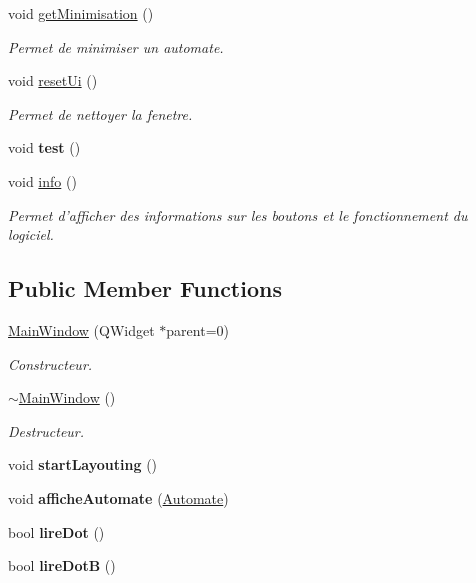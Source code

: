 \begin{DoxyCompactItemize}
void \hyperlink{class_main_window_ae81811139b9d004b68f5654ad40a7b52}{get\-Minimisation} ()
\begin{DoxyCompactList}\small\item\em Permet de minimiser un automate. \end{DoxyCompactList}\item 
void \hyperlink{class_main_window_ae0830e3c5a46ae29d7fd9cc870fe6c08}{reset\-Ui} ()
\begin{DoxyCompactList}\small\item\em Permet de nettoyer la fenetre. \end{DoxyCompactList}\item 
\hypertarget{class_main_window_adef6f7c5939e0e2b60414a55d716ddc8}{void {\bfseries test} ()}\label{class_main_window_adef6f7c5939e0e2b60414a55d716ddc8}

\item 
void \hyperlink{class_main_window_a78f945084286506a64269d4ee75db224}{info} ()
\begin{DoxyCompactList}\small\item\em Permet d'afficher des informations sur les boutons et le fonctionnement du logiciel. \end{DoxyCompactList}\end{DoxyCompactItemize}
\subsection*{Public Member Functions}
\begin{DoxyCompactItemize}
\item 
\hyperlink{class_main_window_a8b244be8b7b7db1b08de2a2acb9409db}{Main\-Window} (Q\-Widget $\ast$parent=0)
\begin{DoxyCompactList}\small\item\em Constructeur. \end{DoxyCompactList}\item 
\hyperlink{class_main_window_ae98d00a93bc118200eeef9f9bba1dba7}{$\sim$\-Main\-Window} ()
\begin{DoxyCompactList}\small\item\em Destructeur. \end{DoxyCompactList}\item 
\hypertarget{class_main_window_a22ccaf0f029e895977c18774bf9ef115}{void {\bfseries start\-Layouting} ()}\label{class_main_window_a22ccaf0f029e895977c18774bf9ef115}

\item 
\hypertarget{class_main_window_ac9f5af352ce35293a2246f28af46b88c}{void {\bfseries affiche\-Automate} (\hyperlink{class_automate}{Automate})}\label{class_main_window_ac9f5af352ce35293a2246f28af46b88c}

\item 
\hypertarget{class_main_window_a7c730609e4e9f30d1b2dc88f8762a05c}{bool {\bfseries lire\-Dot} ()}\label{class_main_window_a7c730609e4e9f30d1b2dc88f8762a05c}

\item 
\hypertarget{class_main_window_ac9ec17b8cd9fe73a0cddfdc4423c9fb3}{bool {\bfseries lire\-Dot\-B} ()}\label{class_main_window_ac9ec17b8cd9fe73a0cddfdc4423c9fb3}

\end{DoxyCompactItemize}
